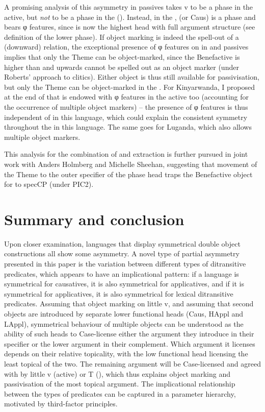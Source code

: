 \documentclass[output=paper]{LSP/langsci}
\begin{document}
A promising analysis of this asymmetry in passives takes v to be a phase in the active, but \textit{not} to be a phase in the  (\citealt{Chomsky2008,Legate2012}). Instead, in the ,  (or Caus) is a phase and bears φ features, since  is now the highest head with full argument structure (see  definition of the lower phase). If object marking is indeed the spell-out of a (downward)  relation, the exceptional presence of φ features on  in  and  passives implies that only the Theme can be object-marked, since the Benefactive is higher than  and upwards  cannot be spelled out as an object marker (under Roberts’ \citeyear{Roberts2010} approach to clitics). Either object is thus still available for passivisation, but only the Theme can be object-marked in the . For Kinyarwanda, I proposed at the end of  that  is endowed with φ features in the active too (accounting for the occurrence of multiple object markers) -- the presence of φ features is thus independent of  in this language, which could explain the consistent symmetry throughout the  in this language. The same goes for Luganda, which also allows multiple object markers.

This analysis for the combination of  and extraction is further pursued in joint work with Anders Holmberg and Michelle Sheehan, suggesting that movement of the Theme to the outer specifier of the  phase head traps the Benefactive object for  to specCP (under PIC2).

\section{Summary and conclusion}\label{sec:vdw:5}

Upon closer examination,  languages that display symmetrical double object constructions all show some asymmetry. A novel type of partial asymmetry presented in this paper is the variation between different types of ditransitive predicates, which appears to have an implicational pattern: if a language is symmetrical for causatives, it is also symmetrical for applicatives, and if it is symmetrical for applicatives, it is also symmetrical for lexical ditransitive predicates. Assuming that object marking   on little v, and assuming that second objects are introduced by separate lower functional heads (Caus, HAppl and LAppl), symmetrical behaviour of multiple objects can be understood as the ability of such heads to Case-license either the argument they introduce in their specifier or the lower argument in their complement. Which argument it licenses depends on their relative topicality, with the low functional head licensing the least topical of the two. The remaining argument will be Case-licensed and agreed with by little v (active) or T (), which thus explains object marking and passivisation of the most topical argument. The implicational relationship between the types of predicates can be captured in a parameter hierarchy, motivated by third-factor principles.
\end{document}
